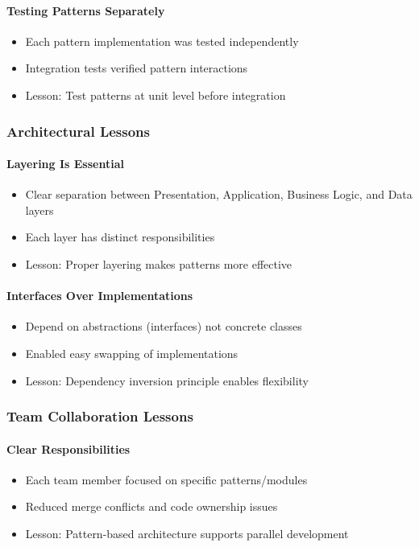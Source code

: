 \documentclass[11pt, a4paper]{article}
\theoremstyle{plain}
\theoremstyle{definition}
\begin{document}
\paragraph{Testing Patterns Separately}
\begin{itemize}
    \item Each pattern implementation was tested independently
    \item Integration tests verified pattern interactions
    \item Lesson: Test patterns at unit level before integration
\end{itemize}

\subsubsection{Architectural Lessons}

\paragraph{Layering Is Essential}
\begin{itemize}
    \item Clear separation between Presentation, Application, Business Logic, and Data layers
    \item Each layer has distinct responsibilities
    \item Lesson: Proper layering makes patterns more effective
\end{itemize}

\paragraph{Interfaces Over Implementations}
\begin{itemize}
    \item Depend on abstractions (interfaces) not concrete classes
    \item Enabled easy swapping of implementations
    \item Lesson: Dependency inversion principle enables flexibility
\end{itemize}

\subsubsection{Team Collaboration Lessons}

\paragraph{Clear Responsibilities}
\begin{itemize}
    \item Each team member focused on specific patterns/modules
    \item Reduced merge conflicts and code ownership issues
    \item Lesson: Pattern-based architecture supports parallel development
\end{itemize}
\end{document}

